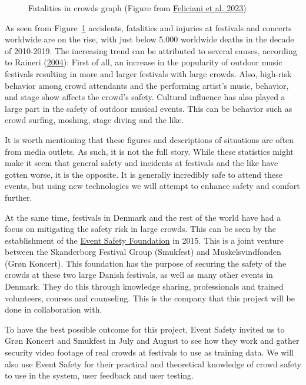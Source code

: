 \documentclass[
]{article}
\begin{document}
\begin{figure}
{}

\caption{\label{fig-fatalities}Fatalities in crowds graph (Figure from
\protect\hyperlink{ref-FELICIANI2023106174}{Feliciani et al. 2023})}

\end{figure}

As seen from Figure~\ref{fig-fatalities} accidents, fatalities and
injuries at festivals and concerts worldwide are on the rise, with just
below 5.000 worldwide deaths in the decade of 2010-2019. The increasing
trend can be attributed to several causes, according to Raineri
(\protect\hyperlink{ref-inproceedings}{2004}): First of all, an increase
in the popularity of outdoor music festivals resulting in more and
larger festivals with large crowds. Also, high-risk behavior among crowd
attendants and the performing artist's music, behavior, and stage show
affects the crowd's safety. Cultural influence has also played a large
part in the safety of outdoor musical events. This can be behavior such
as crowd surfing, moshing, stage diving and the like.

It is worth mentioning that these figures and descriptions of situations
are often from media outlets. As such, it is not the full story. While
these statistics might make it seem that general safety and incidents at
festivals and the like have gotten worse, it is the opposite. It is
generally incredibly safe to attend these events, but using new
technologies we will attempt to enhance safety and comfort further.

At the same time, festivals in Denmark and the rest of the world have
had a focus on mitigating the safety risk in large crowds. This can be
seen by the establishment of the
\href{https://eventsafety.dk/historie}{Event Safety Foundation} in 2015.
This is a joint venture between the Skanderborg Festival Group
(Smukfest) and Muskelsvindfonden (Grøn Koncert). This foundation has the
purpose of securing the safety of the crowds at these two large Danish
festivals, as well as many other events in Denmark. They do this through
knowledge sharing, professionals and trained volunteers, courses and
counseling. This is the company that this project will be done in
collaboration with.

To have the best possible outcome for this project, Event Safety invited
us to Grøn Koncert and Smukfest in July and August to see how they work
and gather security video footage of real crowds at festivals to use as
training data. We will also use Event Safety for their practical and
theoretical knowledge of crowd safety to use in the system, user
feedback and user testing.
\end{document}
